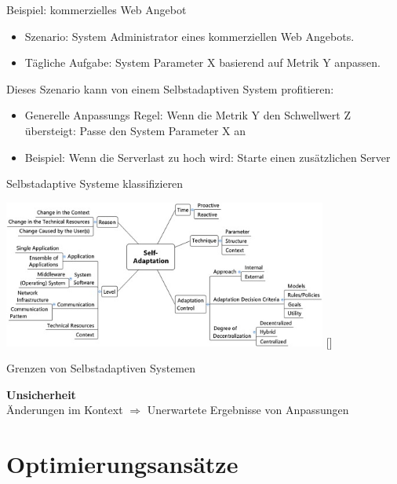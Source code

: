 \documentclass[de,16:9]{sdqbeamer}
\begin{document}
\begin{frame}{Beispiel: kommerzielles Web Angebot}
	\begin{itemize}
		\item Szenario: System Administrator eines kommerziellen Web Angebots.
		\item Tägliche Aufgabe: System Parameter X basierend auf Metrik Y anpassen.
	\end{itemize}
	\medskip
	Dieses Szenario kann von einem Selbstadaptiven System profitieren:
	\begin{itemize}
		\item Generelle Anpassungs Regel:
		Wenn die Metrik Y den Schwellwert Z übersteigt: Passe den System Parameter X an
		\item Beispiel: Wenn die Serverlast zu hoch wird: Starte einen zusätzlichen Server
	\end{itemize}
\end{frame}

\begin{frame}{Selbstadaptive Systeme klassifizieren}
	\begin{center}
		\includegraphics[width=0.8\textwidth]{sources/KrupitzerTaxonomy.jpg}
		[\cite{SurveyOnEngineeringApproaches}]
	\end{center}
\end{frame}

\begin{frame}{Grenzen von Selbstadaptiven Systemen}
	\begin{center}
		\Large \textbf{Unsicherheit}
		\\ \medskip
		Änderungen im Kontext $\Rightarrow$ Unerwartete Ergebnisse von Anpassungen
	\end{center}
\end{frame}

\section{Optimierungsansätze}
\end{document}

